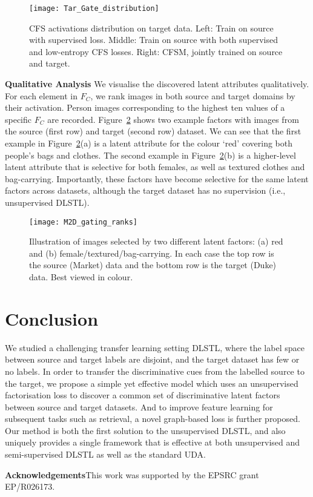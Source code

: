 \documentclass[letterpaper]{article} \usepackage{aaai19}  \usepackage{times}  \usepackage{helvet}  \usepackage{courier}  \usepackage{url}  \usepackage{graphicx}
\newcommand{\keypoint}[1]{\noindent\textbf{#1}\quad}
\begin{document}
\begin{figure}[t]
\centering    
\texttt{[image: Tar\_Gate\_distribution]}
\caption{CFS activations distribution on target data. Left: Train on source with supervised loss. Middle: Train on source with both supervised and low-entropy CFS losses. Right: CFSM, jointly trained on source and target.}
\label{fig:CFS_distribution}
\end{figure}

\keypoint{Qualitative Analysis} We visualise the discovered latent attributes qualitatively. For each element in $F_C$, we rank images in both source and target domains by their activation. Person images corresponding to the highest ten values of a specific $F_C$ are recorded. Figure~\ref{fig:CFS_latent_attri} shows two example factors with images from the source (first row) and target (second row) dataset. We can see that the first example in Figure~\ref{fig:CFS_latent_attri}(a) is a latent attribute for the colour `red' covering both people's bags and clothes. The second example in Figure~\ref{fig:CFS_latent_attri}(b) is a higher-level latent attribute that is selective for both females, as well as textured clothes and bag-carrying. Importantly, these factors have become selective for the same latent factors across  datasets, although the target dataset has no supervision (i.e., unsupervised DLSTL).



\begin{figure}[t]
\centering    
\texttt{[image: M2D\_gating\_ranks]}
\caption{Illustration of images selected by two different latent factors: (a) red and (b) female/textured/bag-carrying. In each case the top row is the source (Market) data  and the bottom row is the target (Duke) data. Best viewed in colour.}
\label{fig:CFS_latent_attri}
\end{figure}




\section{Conclusion}\label{Sec:Con}
We studied a challenging transfer learning setting DLSTL, where the label space between source and target labels are disjoint, and the target dataset has few or no labels. In order to transfer the discriminative cues from the labelled source to the target, we propose a simple yet effective model which uses an unsupervised factorisation loss to discover a common set of discriminative latent factors between source and target datasets. And to improve feature learning for subsequent tasks such as retrieval, a novel graph-based loss is further proposed. Our method is both the first solution to the unsupervised DLSTL, and also uniquely provides a single framework that is effective at both unsupervised and semi-supervised DLSTL as well as the standard UDA. 


\keypoint{Acknowledgements}This work was supported by the EPSRC grant EP/R026173.

{\small


}
\end{document}
